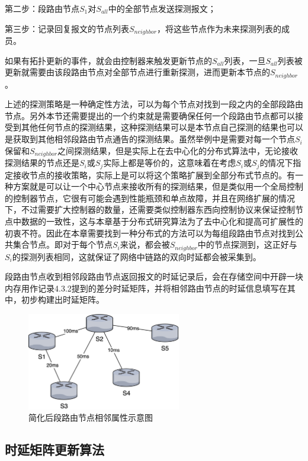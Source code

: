 第二步：段路由节点$S_1$对$S_{all}$中的全部节点发送探测报文；

第三步：记录回复报文的节点列表$S_{neighbor}$，将这些节点作为未来探测列表的成员。

如果有拓扑更新的事件，就会由控制器来触发更新节点的$S_{all}$列表，一旦$S_{all}$列表被更新就需要由该段路由节点对全部节点进行重新探测，进而更新本节点的$S_{neighbor}$。

上述的探测策略是一种确定性方法，可以为每个节点对找到一段之内的全部段路由节点。另外本节还需要提出的一个约束就是需要确保任何一个段路由节点都可以接受到其他任何节点的探测结果，这种探测结果可以是本节点自己探测的结果也可以是获取到其他相邻段路由节点通告的探测结果。虽然举例中是需要对每一个节点$S_i$保留和$S_{neighbor}$之间探测结果，但是实际上在去中心化的分布式算法中，无论接收探测结果的节点还是$S_i$或$S_j$实际上都是等价的，这意味着在考虑$S_i$或$S_j$的情况下指定接收节点的接收策略，实际上是可以将这个策略扩展到全部分布式节点的。有一种方案就是可以让一个中心节点来接收所有的探测结果，但是类似用一个全局控制的控制器节点，它很有可能会遇到性能瓶颈和单点故障，并且在网络扩展的情况下，不过需要扩大控制器的数量，还需要类似控制器东西向控制协议来保证控制节点中数据的一致性，这与本章基于分布式研究算法为了去中心化和提高可扩展性的初衷不符。因此在本章需要找到一种分布式的方法可以为每组段路由节点对找到公共集合节点。即对于每个节点$S_i$来说，都会被$S_{neighbor}$中的节点探测到，这正好与$S_i$的探测列表相同，这就保证了网络中链路的双向时延都会被采集到。

段路由节点收到相邻段路由节点返回报文的时延记录后，会在存储空间中开辟一块内存用作记录4.3.2提到的差分时延矩阵，并将相邻路由节点的时延信息填写在其中，初步构建出时延矩阵。

\begin{figure}[htbp]
\setlength{\abovecaptionskip}{15pt plus 3pt minus 2pt}
\centerline{\includegraphics[width=0.6\textwidth]{./figures/ch4-simple-topo.png}}
\caption{简化后段路由节点相邻属性示意图}
\label{fig-ch4-simple-topo}
\end{figure}

\subsection{时延矩阵更新算法}

